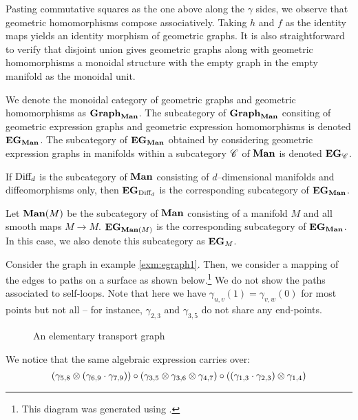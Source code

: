 \documentclass[./Thick_TQFTs_and_Quantum_Information.tex]{subfiles}
\begin{document}
Pasting commutative squares as the one above along the $\gamma$ sides, we
observe that geometric homomorphisms compose associatively. Taking
$h$ and $f$ as the identity maps yields an identity morphism of geometric
graphs. It is also straightforward to verify that disjoint union gives
geometric graphs along with geometric homomorphisms a monoidal structure with
the empty graph in the empty manifold as the monoidal unit.

\begin{defn}
We denote the monoidal category of geometric graphs and geometric
homomorphisms as $\textbf{Graph}_{\textbf{Man}}$. The subcategory of
$\textbf{Graph}_{\textbf{Man}}$ consiting of geometric expression graphs and geometric
expression homomorphisms is denoted $\textbf{EG}_{\textbf{Man}}$. The subcategory of
$\textbf{EG}_{\textbf{Man}}$ obtained by considering geometric expression graphs in manifolds
within a subcategory $\mathscr{C}$ of $\textbf{Man}$ is denoted $\textbf{EG}_{\mathscr{C}}$.
\end{defn}

\begin{exm}
If $\text{Diff}_d$ is the subcategory of $\textbf{Man}$ consisting of $d$--dimensional
manifolds and diffeomorphisms only, then $\textbf{EG}_{\text{Diff}_d}$ is the corresponding
subcategory of $\textbf{EG}_{\textbf{Man}}$.
\end{exm}

\begin{exm}
Let $\textbf{Man}(M)$ be the subcategory of $\textbf{Man}$ consisting of a manifold $M$ and all
smooth maps $M \to M$. $\textbf{EG}_{\textbf{Man}(M)}$ is the corresponding subcategory of
$\textbf{EG}_{\textbf{Man}}$. In this case, we also denote this subcategory as $\textbf{EG}_M$.
\end{exm}

\begin{exm}
Consider the graph in example \ref{exm:egraph1}. Then, we consider a mapping of
the edges to paths on a surface as shown below.\footnote{This diagram was
generated using \cite{Mathcha}.} We do not show the paths associated to
self-loops. Note that here we have $\gamma_{u, v}(1) = \gamma_{v, w}(0)$ for
most points but not all -- for instance, $\gamma_{2, 3}$ and $\gamma_{3, 5}$ do
not share any end-points.
\begin{figure}[H]
\begin{center}

\end{center}
\caption{An elementary transport graph}
\end{figure}
We notice that the same algebraic expression carries over:
\[
  (\gamma_{5, 8} \otimes (\gamma_{6, 9} \cdot \gamma_{7, 9})) \circ
  (\gamma_{3, 5} \otimes \gamma_{3, 6} \otimes \gamma_{4, 7}) \circ
  ((\gamma_{1, 3} \cdot \gamma_{2, 3}) \otimes \gamma_{1, 4})
\]
\end{exm}
\end{document}

